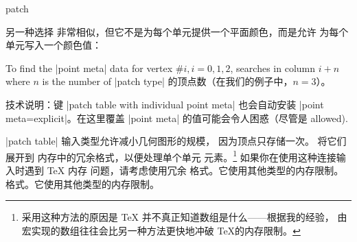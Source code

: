{\begin{plottype}[/pgfplots]{patch}
\begin{pgfplotskeylist}
        另一种选择  非常相似，但它不是为每个单元提供一个平面颜色，而是允许
        为每个单元写入一个颜色值：
\begin{codeexample}[]
\end{codeexample}
        \noindent To find the |point meta| data for vertex $\#i, i=0,1,2$,
        \PGFPlots{} searches in column $i+n$ where $n$ is the number of
        |patch type| 的顶点数（在我们的例子中，$n=3$）。

        技术说明：键 |patch table with individual point meta|
        也会自动安装 |point meta=explicit|。在这里覆盖
        |point meta| 的值可能会令人困惑（尽管是
        allowed).

        |patch table| 输入类型允许减小几何图形的规模，
        因为顶点只存储一次。\PGFPlots{} 将它们展开到
        内存中的冗余格式，以便处理单个单元
        元素。\footnote{采用这种方法的原因是 \TeX{}
        并不真正知道数组是什么——根据我的经验，
        由宏实现的数组往往会比另一种方法更快地冲破 \TeX 的内存限制。} 如果你在使用这种连接输入时遇到 \TeX{} 内存
        问题，请考虑使用冗余
        格式。它使用其他类型的内存限制。
        格式。它使用其他类型的内存限制。
    \end{pgfplotskeylist}


\end{plottype}}
